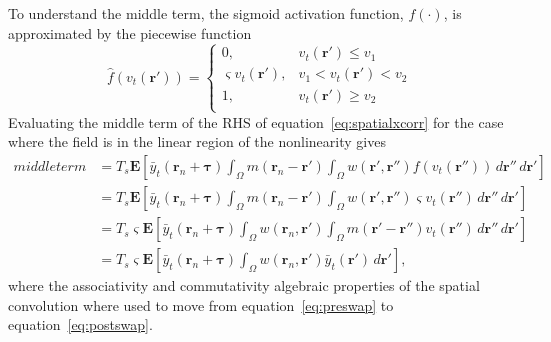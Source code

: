 \documentclass[]{article}
\begin{document}
To understand the middle term, the sigmoid activation function, $f(\cdot)$, is approximated by the piecewise function
\begin{equation}
	\hat{f}(v_t(\mathbf{r}')) = \left\{ \begin{array}{ll}
		0, & v_t(\mathbf{r}') \le v_1 \\
		\varsigma v_t(\mathbf{r}'), &  v_1 < v_t(\mathbf{r}') < v_2 \\
		1, & v_t(\mathbf{r}') \ge v_2 \\ 
		\end{array}\right.
\end{equation}
Evaluating the middle term of the RHS of equation~\ref{eq:spatialxcorr} for the case where the field is in the linear region of the nonlinearity gives
\begin{align}
	middle term &= T_s\mathbf{E}\left[ \bar{y}_t\left( \mathbf{r}_n + \boldsymbol{\tau} \right) \int_{\Omega}{ m\left(\mathbf{r}_n-\mathbf{r}'\right)\int_\Omega { w\left(\mathbf{r}',\mathbf{r}''\right) f\left(v_t\left(\mathbf{r}''\right)\right)\, d\mathbf{r}''}\, d\mathbf{r}'}\right]  \\
	&=T_s\mathbf{E}\left[ \bar{y}_t\left( \mathbf{r}_n + \boldsymbol{\tau} \right) \int_{\Omega}{ m\left(\mathbf{r}_n-\mathbf{r}'\right)\int_\Omega { w\left(\mathbf{r}',\mathbf{r}''\right) \varsigma v_t\left(\mathbf{r}''\right)\, d\mathbf{r}''}\, d\mathbf{r}'}\right] \label{eq:preswap}  \\
	&= T_s\varsigma\mathbf{E}\left[ \bar{y}_t\left( \mathbf{r}_n + \boldsymbol{\tau} \right) \int_{\Omega}{ w\left(\mathbf{r}_n,\mathbf{r}'\right) \int_\Omega {  m\left(\mathbf{r}'-\mathbf{r}''\right) v_t\left(\mathbf{r}''\right)\, d\mathbf{r}''}\, d\mathbf{r}'}\right]  \label{eq:postswap} \\
	&= T_s\varsigma\mathbf{E}\left[ \bar{y}_t\left( \mathbf{r}_n + \boldsymbol{\tau} \right) \int_{\Omega}{ w\left(\mathbf{r}_n,\mathbf{r}'\right) \bar{y}_t\left(\mathbf{r}'\right)\, d\mathbf{r}'}\right],	
\end{align}
where the associativity and commutativity algebraic properties of the spatial convolution where used to move from equation~\ref{eq:preswap} to equation~\ref{eq:postswap}.
% 
\end{document}
